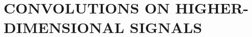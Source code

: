 \documentclass[twoside]{article}
\theoremstyle{definition}
\theoremstyle{remark}
\begin{document}




\section{CONVOLUTIONS ON HIGHER-DIMENSIONAL SIGNALS}
\label{sec:higherDim}
\end{document}
